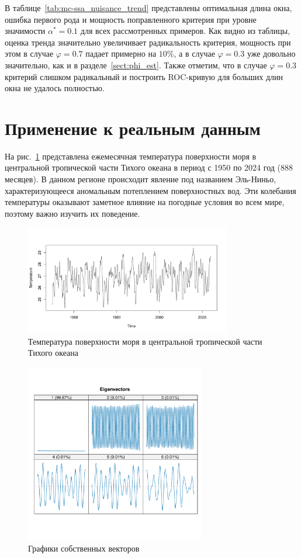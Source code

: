 \documentclass[specialist,
substylefile = spbu.rtx,
               subf,href,colorlinks=true, 12pt]{disser}
\theoremstyle{definition}
\begin{document}
В таблице~\ref{tab:mc-ssa_nuisance_trend} представлены оптимальная длина окна, ошибка первого рода и мощность поправленного критерия при уровне значимости $\alpha^*=0.1$ для всех рассмотренных примеров. Как видно из таблицы, оценка тренда значительно увеличивает радикальность критерия, мощность при этом в случае $\varphi=0.7$ падает примерно на $10\%$, а в случае $\varphi=0.3$ уже довольно значительно, как и в разделе~\ref{sect:phi_est}. Также отметим, что в случае $\varphi=0.3$ критерий слишком радикальный и построить ROC-кривую для больших длин окна не удалось полностью.

\section{Применение к реальным данным}\label{sect:examples}
На рис.~\ref{Nino_ts} представлена ежемесячная температура поверхности моря в центральной тропической части Тихого океана в период с 1950 по 2024 год ($888$ месяцев). В данном регионе происходит явление под названием Эль-Ниньо, характеризующееся аномальным потеплением поверхностных вод. Эти колебания температуры оказывают заметное влияние на погодные условия во всем мире, поэтому важно изучить их поведение.
\begin{figure}[h!]
	\centering
	\includegraphics[width=0.8\textwidth]{img/Nino_ts.pdf}
	\caption{Температура поверхности моря в центральной тропической части Тихого океана}
	\label{Nino_ts}	
\end{figure}
\begin{figure}[h!]
	\centering
	\includegraphics[width=0.7\textwidth]{img/Nino_ssa_vectors.pdf}
	\caption{Графики собственных векторов}
	\label{Nino_ssa_vectors}	
\end{figure}
\end{document}
